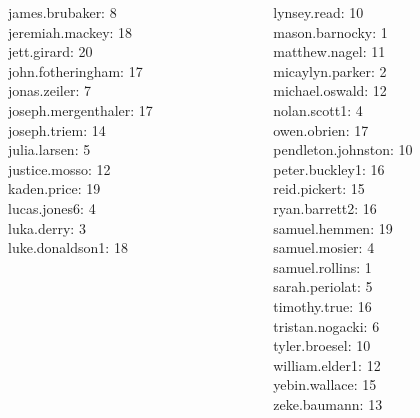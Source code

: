 \documentclass[10pt]{beamer}
\begin{document}
\begin{frame}
\begin{columns}
\begin{column}{0.33\textwidth}
james.brubaker: 8 \\ 
jeremiah.mackey: 18 \\ 
jett.girard: 20 \\ 
john.fotheringham: 17 \\ 
jonas.zeiler: 7 \\ 
joseph.mergenthaler: 17 \\ 
joseph.triem: 14 \\ 
julia.larsen: 5 \\ 
justice.mosso: 12 \\ 
kaden.price: 19 \\ 
lucas.jones6: 4 \\ 
luka.derry: 3 \\ 
luke.donaldson1: 18 \\\end{column}
\begin{column}{0.33\textwidth}
lynsey.read: 10 \\ 
mason.barnocky: 1 \\ 
matthew.nagel: 11 \\ 
micaylyn.parker: 2 \\ 
michael.oswald: 12 \\ 
nolan.scott1: 4 \\ 
owen.obrien: 17 \\ 
pendleton.johnston: 10 \\ 
peter.buckley1: 16 \\ 
reid.pickert: 15 \\ 
ryan.barrett2: 16 \\ 
samuel.hemmen: 19 \\ 
samuel.mosier: 4 \\ 
samuel.rollins: 1 \\ 
sarah.periolat: 5 \\ 
timothy.true: 16 \\ 
tristan.nogacki: 6 \\ 
tyler.broesel: 10 \\ 
william.elder1: 12 \\ 
yebin.wallace: 15 \\ 
zeke.baumann: 13 \\\end{column}
\end{columns}
\vfill
\end{frame}
\end{document}
